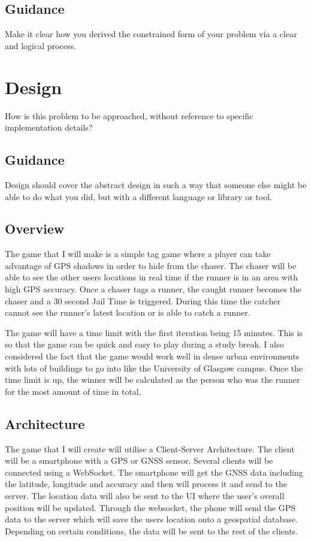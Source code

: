 \documentclass{l4proj}
\begin{document}
\section{Guidance}
Make it clear how you derived the constrained form of your problem via a clear and logical process. 

\chapter{Design}
How is this problem to be approached, without reference to specific implementation details? 
\section{Guidance}
Design should cover the abstract design in such a way that someone else might be able to do what you did, but with a different language or library or tool.

\section{Overview}
\label{game-overview}
The game that I will make is a simple tag game where a player can take advantage of GPS shadows in order to hide from
the chaser. The chaser will be able to see the other users locations in real time if the runner is in an area with
high GPS accuracy. Once a chaser tags a runner, the caught runner becomes the chaser and a 30 second Jail Time is
triggered. During this time the catcher cannot see the runner's latest location or is able to catch a runner.

The game will have a time limit with the first iteration being 15 minutes. This is so that the game can be quick and
easy to play during a study break. I also considered the fact that the game would work well in dense urban environments
with lots of buildings to go into like the University of Glasgow campus. Once the time limit is up, the winner will
be calculated as the person who was the runner for the most amount of time in total.

\section{Architecture}
The game that I will create will utilise a Client-Server Architecture. The client will be a smartphone with a GPS or
GNSS sensor. Several clients will be connected using a WebSocket. The smartphone will get the GNSS data including the
latitude, longitude and accuracy and then will process it and send to the server. The location data will also be sent 
to the UI where the user's overall position will be updated. Through the websocket, the phone will send the GPS data
to the server which will save the users location onto a geospatial database. Depending on certain conditions, the data
will be sent to the rest of the clients.
\end{document}
